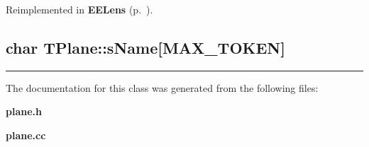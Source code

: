 Reimplemented in {\bf EELens} {\rm (p.~\pageref{EELens_d1})}.\label{TPlane_b1}
\subsection{\setlength{\rightskip}{0pt plus 5cm}char TPlane::s\-Name[MAX\_\-TOKEN]\hspace{0.3cm}{\tt  [protected]}}

\vspace{0.4cm}\hrule\vspace{0.2cm}
The documentation for this class was generated from the following files:\begin{CompactItemize}
\item 
{\bf plane.h}\item 
{\bf plane.cc}\end{CompactItemize}
